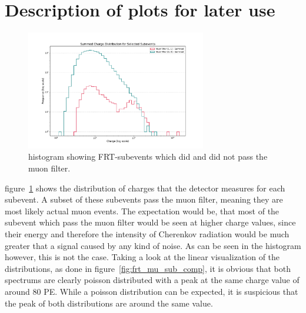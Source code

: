 \section{Description of plots for later use}
\begin{figure}
    \centering
    \includegraphics[width=0.7\textwidth]{Plots/frt_muon_filter_sub.pdf}
    \caption{histogram showing FRT-subevents which did and did not pass the muon filter.}
    \label{fig:frt_mu_sub}
\end{figure}

figure~\ref{fig:frt_mu_sub} shows the distribution of charges that the detector measures for each subevent. A subset of these subevents pass the muon filter, 
meaning they are most likely actual muon events. The expectation would be, that most of the subevent which pass the muon filter would be seen at higher charge values,
since their energy and therefore the intensity of Cherenkov radiation would be much greater that a signal caused by any kind of noise. As can be seen in the 
histogram however, this is not the case. Taking a look at the linear visualization of the distributions, as done in figure~\ref{fig:frt_mu_sub_comp}, it is obvious that 
both spectrums are clearly poisson distributed with a peak at the same charge value of around 80 PE. While a poisson distribution can be expected, it is 
suspicious that the peak of both distributions are around the same value. 

